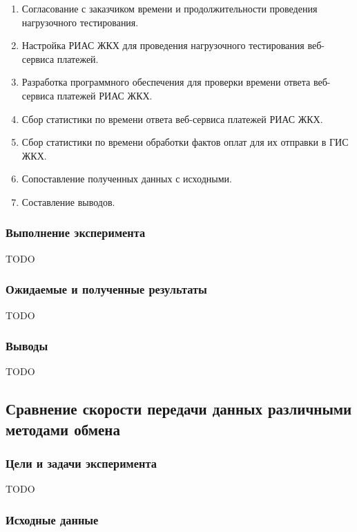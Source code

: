 \begin{enumerate}
	\item Согласование с заказчиком времени и продолжительности проведения нагрузочного тестирования.
	\item Настройка РИАС ЖКХ для проведения нагрузочного тестирования веб-сервиса платежей.
	\item Разработка программного обеспечения для проверки времени ответа веб-сервиса платежей РИАС ЖКХ.
	\item Сбор статистики по времени ответа веб-сервиса платежей РИАС ЖКХ.
	\item Сбор статистики по времени обработки фактов оплат для их отправки в ГИС ЖКХ.
	\item Сопоставление полученных данных с исходными.
	\item Составление выводов.
\end{enumerate}

\subsubsection*{Выполнение эксперимента}

TODO

\subsubsection*{Ожидаемые и полученные результаты}

TODO

\subsubsection*{Выводы}

TODO

\subsection{Сравнение скорости передачи данных различными методами обмена}

\subsubsection*{Цели и задачи эксперимента}

TODO

\subsubsection*{Исходные данные}


